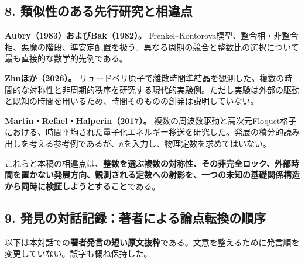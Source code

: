 \documentclass[
  a4paper,
]{ltjsarticle}
\begin{document}
\subsection{8.
類似性のある先行研究と相違点}\label{ux985eux4f3cux6027ux306eux3042ux308bux5148ux884cux7814ux7a76ux3068ux76f8ux9055ux70b9}

\textbf{Aubry（1983）およびBak（1982）。}
Frenkel--Kontorova模型、整合相・非整合相、悪魔の階段、準安定配置を扱う。異なる周期の競合と整数比の選択について最も直接的な数学的先例である。

\textbf{Zhuほか（2026）。}
リュードベリ原子で離散時間準結晶を観測した。複数の時間的な対称性と非周期的秩序を研究する現代的実験例。ただし実験は外部の駆動と既知の時間を用いるため、時間そのものの創発は説明していない。

\textbf{Martin・Refael・Halperin（2017）。}
複数の周波数駆動と高次元Floquet格子における、時間平均された量子化エネルギー移送を研究した。発展の積分的読み出しを考える参考例であるが、\(\hbar\)を入力し、物理定数を求めてはいない。

これらと本稿の相違点は、\textbf{整数を選ぶ複数の対称性、その非完全ロック、外部時間を置かない発展方向、観測される定数への射影を、一つの未知の基礎関係構造から同時に検証しようとすること}である。

\subsection{9.
発見の対話記録：著者による論点転換の順序}\label{ux767aux898bux306eux5bfeux8a71ux8a18ux9332ux8457ux8005ux306bux3088ux308bux8ad6ux70b9ux8ee2ux63dbux306eux9806ux5e8f}

以下は本対話での\textbf{著者発言の短い原文抜粋}である。文意を整えるために発言順を変更していない。誤字も概ね保持した。
\end{document}
